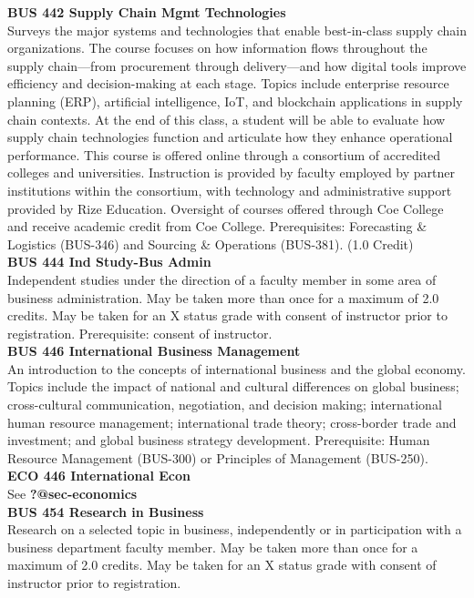 \documentclass[
  letterpaper,
]{scrbook}
\begin{document}
\textbf{BUS 442 Supply Chain Mgmt Technologies}\\
Surveys the major systems and technologies that enable best-in-class
supply chain organizations. The course focuses on how information flows
throughout the supply chain---from procurement through delivery---and
how digital tools improve efficiency and decision-making at each stage.
Topics include enterprise resource planning (ERP), artificial
intelligence, IoT, and blockchain applications in supply chain contexts.
At the end of this class, a student will be able to evaluate how supply
chain technologies function and articulate how they enhance operational
performance. This course is offered online through a consortium of
accredited colleges and universities. Instruction is provided by faculty
employed by partner institutions within the consortium, with technology
and administrative support provided by Rize Education. Oversight of
courses offered through Coe College and receive academic credit from Coe
College. Prerequisites: Forecasting \& Logistics (BUS-346) and Sourcing
\& Operations (BUS-381). (1.0 Credit)\\
\textbf{BUS 444 Ind Study-Bus Admin}\\
Independent studies under the direction of a faculty member in some area
of business administration. May be taken more than once for a maximum of
2.0 credits. May be taken for an X status grade with consent of
instructor prior to registration. Prerequisite: consent of instructor.\\
\textbf{BUS 446 International Business Management}\\
An introduction to the concepts of international business and the global
economy. Topics include the impact of national and cultural differences
on global business; cross-cultural communication, negotiation, and
decision making; international human resource management; international
trade theory; cross-border trade and investment; and global business
strategy development. Prerequisite: Human Resource Management (BUS-300)
or Principles of Management (BUS-250).\\
\textbf{ECO 446 International Econ}\\
See \textbf{?@sec-economics}\\
\textbf{BUS 454 Research in Business}\\
Research on a selected topic in business, independently or in
participation with a business department faculty member. May be taken
more than once for a maximum of 2.0 credits. May be taken for an X
status grade with consent of instructor prior to registration.
\end{document}
